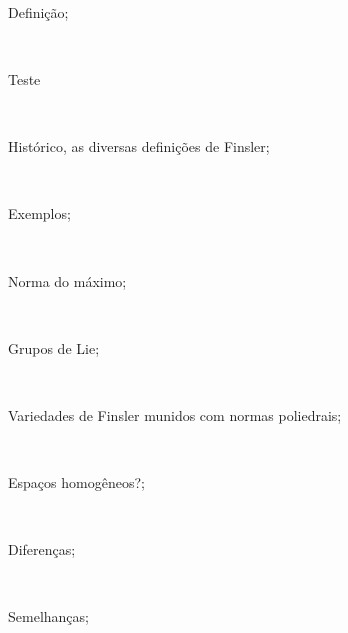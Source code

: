 \documentclass[10pt,reqno]{amsart}
\begin{document}
\

\

\

Definição;

\

Teste

\

Histórico, as diversas definições de Finsler;

\

Exemplos;

\

Norma do máximo;

\

Grupos de Lie;

\

Variedades de Finsler munidos com normas poliedrais;

\

Espaços homogêneos?;

\

Diferenças;

\

Semelhanças;



{}
\end{document}
